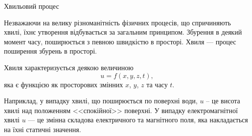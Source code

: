 \documentclass[onlytextwidth]{beamer}
\begin{document}
\begin{frame}{Хвильовий процес}{}
    \begin{block}{}\justifying
        Незважаючи на велику різноманітність фізичних процесів, що спричиняють хвилі, їхнє утворення відбувається за загальним принципом. Збурення в
        деякий момент часу, поширюється з певною швидкістю в просторі. \alert{Хвиля --- процес поширення збурень в просторі}.
    \end{block}

\begin{block}{}\justifying
    Хвиля характеризується деякою величиною
\begin{equation*}
    u = f(x, y, z, t),
\end{equation*}
яка є функцією як просторових змінних $x$, $y$, $z$ та часу $t$.

\bigskip

Наприклад, у випадку хвилі, що поширюється по поверхні води, $u$ -- це
висота хвилі над положенням <<спокійної>> поверхні. У випадку електромагнітної хвилі $u$ --- це змінна складова електричного та магнітного поля, яка
накладається на їхні статичні значення.
\end{block}
\begin{block}{}\justifying

\end{block}
\end{frame}
\end{document}
